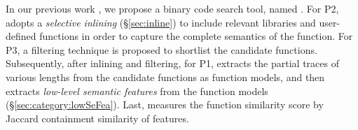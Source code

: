 In our previous work \cite{bingo}, we propose a binary code search tool, named \tool.
For P2, \tool adopts a \emph{selective inlining} (\S\ref{sec:inline}) to include relevant libraries and user-defined functions in order to capture the complete semantics of the function. For P3, a filtering technique   is proposed to shortlist the candidate functions. Subsequently, after inlining and filtering, for P1, \tool extracts the partial traces of various lengths from the candidate functions as function models, and then extracts \emph{low-level semantic features} from the function models (\S\ref{sec:category:lowSeFea}). Last, \tool measures the function similarity score by Jaccard containment similarity of features.




